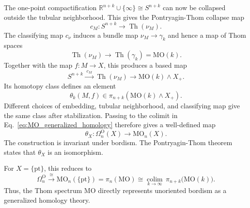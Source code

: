 \documentclass[aps,prx,reprint,superscriptaddress,twocolumn,amsmath,amssymb,amsfonts, nofootinbib]{revtex4-2}
\theoremstyle{apsstyle}
\begin{document}
The one-point compactification
$\mathbb{R}^{n+k}\cup\{\infty\}\cong S^{n+k}$ can now be collapsed outside
the tubular neighborhood. This gives the Pontryagin-Thom collapse map
\begin{equation}
    c_{M}:
    S^{n+k}
    \longrightarrow
    \operatorname{Th}(\nu_{M}).
    \label{eq:PT_collapse_map}
\end{equation}
The classifying map $c_{\nu}$ induces a bundle map
$\nu_{M}\to\gamma_{k}$ and hence a map of Thom spaces
\begin{equation*}
    \operatorname{Th}(\nu_{M})
    \longrightarrow
    \operatorname{Th}(\gamma_{k})
    =
    \mathrm{MO}(k).
\end{equation*}
Together with the map $f:M\to X$, this produces a based map
\begin{equation}
    S^{n+k}
    \xrightarrow{\;c_{M}\;}
    \operatorname{Th}(\nu_{M})
    \longrightarrow
    \mathrm{MO}(k)\wedge X_{+}.
    \label{eq:PT_map_with_background}
\end{equation}
Its homotopy class defines an element
\begin{equation*}
    \theta_{k}(M,f)
    \in
    \pi_{n+k}\left(
        \mathrm{MO}(k)\wedge X_{+}
    \right).
\end{equation*}
Different choices of embedding, tubular neighborhood, and classifying map
give the same class after stabilization. Passing to the colimit in
Eq.~\eqref{eq:MO_generalized_homology} therefore gives a well-defined map
\begin{equation}
    \theta_{X}:
    \Omega_{n}^{\mathrm{O}}(X)
    \longrightarrow
    \mathrm{MO}_{n}(X).
    \label{eq:PT_map}
\end{equation}
The construction is invariant under bordism. The Pontryagin-Thom theorem states that $\theta_{X}$ is an isomorphism.

\noindent For $X=\{\mathrm{pt}\}$, this reduces to
\begin{equation}
    \Omega_{n}^{\mathrm{O}}
    \xrightarrow{\;\cong\;}
    \mathrm{MO}_{n}(\{\mathrm{pt}\})
    =
    \pi_{n}(\mathrm{MO})
    \cong
    \underset{k\to\infty}{\operatorname{colim}}\,
    \pi_{n+k}\bigl(\mathrm{MO}(k)\bigr).
    \label{eq:PT_point_isomorphism}
\end{equation}
Thus, the Thom spectrum $\mathrm{MO}$ directly represents unoriented
bordism as a generalized homology theory.

\bigskip 
\end{document}
